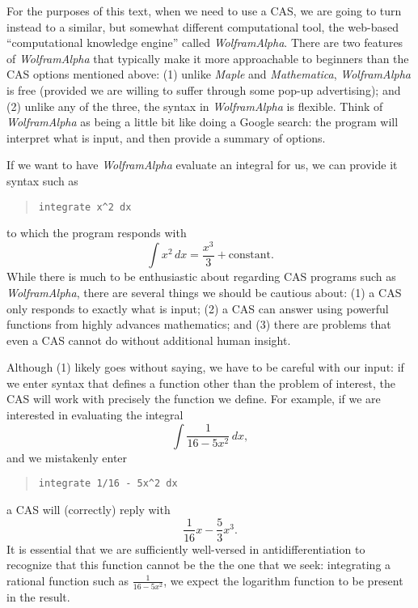 For the purposes of this text, when we need to use a CAS, we are going to turn instead to a similar, but somewhat different computational tool, the web-based ``computational knowledge engine'' called \emph{WolframAlpha}.  There are two features of \emph{WolframAlpha} that typically make it more approachable to beginners than the CAS options mentioned above:  (1) unlike \emph{Maple} and \emph{Mathematica}, \emph{WolframAlpha} is free (provided we are willing to suffer through some pop-up advertising); and (2) unlike any of the three, the syntax in  \emph{WolframAlpha} is flexible.  Think of  \emph{WolframAlpha} as being a little bit like doing a Google search: the program will interpret what is input, and then provide a summary of options.

If we want to have \emph{WolframAlpha} evaluate an integral for us, we can provide it syntax such as
\begin{quote}
\texttt{integrate x\^{}2 dx}
\end{quote}
to which the program responds with
$$\int x^2 \, dx = \frac{x^3}{3} + \mbox{constant}.$$
While there is much to be enthusiastic about regarding CAS programs such as \emph{WolframAlpha}, there are several things we should be cautious about:  (1) a CAS only responds to exactly what is input; (2) a CAS can answer using powerful functions from highly advances mathematics; and (3) there are problems that even a CAS cannot do without additional human insight.

Although (1) likely goes without saying, we have to be careful with our input:  if we enter syntax that defines a function other than the problem of interest, the CAS will work with precisely the function we define.  For example, if we are interested in evaluating the integral
$$\int \frac{1}{16-5x^2} \, dx,$$
and we mistakenly enter 
\begin{quote}
\texttt{integrate 1/16 - 5x\^{}2 dx}
\end{quote}
a CAS will (correctly) reply with 
$$\frac{1}{16}x - \frac{5}{3} x^3.$$
It is essential that we are sufficiently well-versed in antidifferentiation to recognize that this function cannot be the the one that we seek:  integrating a rational function such as $\frac{1}{16-5x^2}$, we expect the logarithm function to be present in the result.

